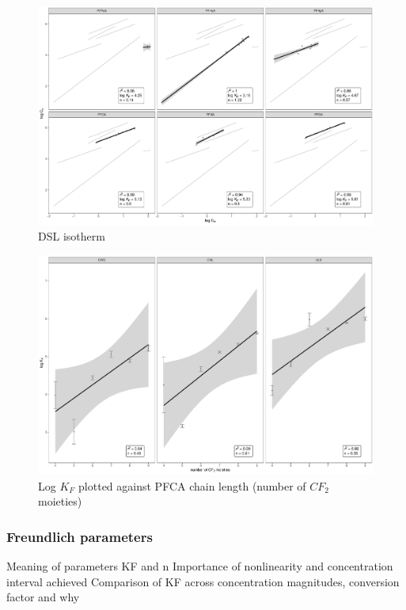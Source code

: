 \begin{figure}
    \centering
    \includegraphics[width=\textwidth]{R/figs/DSL_facet_isotherm.pdf}
    \caption{DSL isotherm}
    \label{fig:DSL_isotherm}
\end{figure}

\begin{figure}
    \centering
    \includegraphics[width=\textwidth]{R/figs/chainlength_KF.pdf}
    \caption{Log $K_F$ plotted against PFCA chain length (number of $CF_2$ moieties)}
    \label{fig:chainlength}
\end{figure}

\subsubsection{Freundlich parameters}
Meaning of parameters KF and n
Importance of nonlinearity and concentration interval achieved 
Comparison of KF across concentration magnitudes, conversion factor and why

